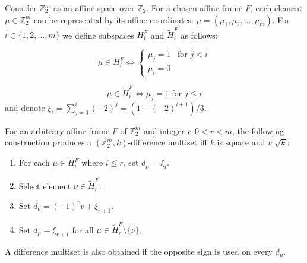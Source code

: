 Consider $\mathbb Z_2^m$ as an affine space over $\mathbb Z_2$. For a chosen affine frame $F$, each element $\mu\in\mathbb Z_2^m$ can be represented by its affine coordinates: $\mu=(\mu_1, \mu_2, \ldots, \mu_m)$. For $i\in\{1,2,\ldots,m\}$ we define subspaces $H_i^F$ and $\widetilde H_i^F$ as follows:

\begin{equation}
    \mu \in H_i^F \iff 
        \begin{cases}
            \mu_j = 1 & \text{for } j < i \\
            \mu_i = 0
        \end{cases}
\end{equation}

\begin{equation}
    \mu \in \widetilde H_i^F \iff 
        \mu_j = 1 \text{ for } j \leq i
\end{equation}
and denote $\xi_i = \sum\limits_{j=0}^i (-2)^j=(1-(-2)^{i+1})/3$.

\begin{theorem}
    \label{z2i:theorem:construction}
    For an arbitrary affine frame $F$ of $\mathbb Z_2^m$ and integer $r \colon 0 < r < m$, the following construction produces a $(\mathbb Z_2^m, k)$-difference multiset iff $k$ is square and $v | \sqrt k$:
    \begin{enumerate}
        \item For each $\mu \in H_i^F$ where $i \leq r$, set $d_\mu = \xi_i$.
        \item Select element $\nu \in \widetilde H_r^F$.
        \item Set $d_\nu = (-1)^r v + \xi_{r+1}$.
        \item Set $d_\mu = \xi_{r+1}$ for all $\mu \in \widetilde H_r^F\setminus\{\nu\}$.
    \end{enumerate}
    A difference multiset is also obtained if the opposite sign is used on every $d_\mu$.
\end{theorem}


